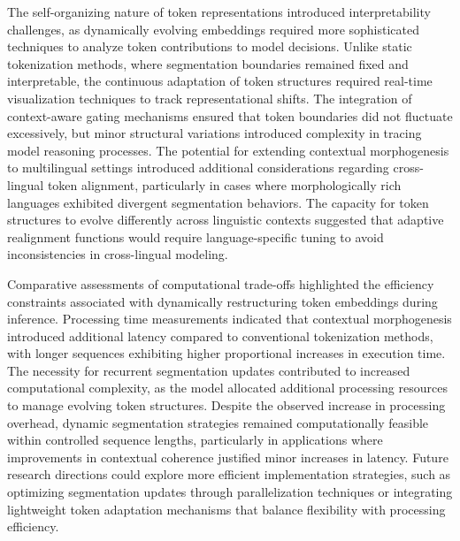 \documentclass{article}
\begin{document}
The self-organizing nature of token representations introduced interpretability challenges, as dynamically evolving embeddings required more sophisticated techniques to analyze token contributions to model decisions. Unlike static tokenization methods, where segmentation boundaries remained fixed and interpretable, the continuous adaptation of token structures required real-time visualization techniques to track representational shifts. The integration of context-aware gating mechanisms ensured that token boundaries did not fluctuate excessively, but minor structural variations introduced complexity in tracing model reasoning processes. The potential for extending contextual morphogenesis to multilingual settings introduced additional considerations regarding cross-lingual token alignment, particularly in cases where morphologically rich languages exhibited divergent segmentation behaviors. The capacity for token structures to evolve differently across linguistic contexts suggested that adaptive realignment functions would require language-specific tuning to avoid inconsistencies in cross-lingual modeling.

Comparative assessments of computational trade-offs highlighted the efficiency constraints associated with dynamically restructuring token embeddings during inference. Processing time measurements indicated that contextual morphogenesis introduced additional latency compared to conventional tokenization methods, with longer sequences exhibiting higher proportional increases in execution time. The necessity for recurrent segmentation updates contributed to increased computational complexity, as the model allocated additional processing resources to manage evolving token structures. Despite the observed increase in processing overhead, dynamic segmentation strategies remained computationally feasible within controlled sequence lengths, particularly in applications where improvements in contextual coherence justified minor increases in latency. Future research directions could explore more efficient implementation strategies, such as optimizing segmentation updates through parallelization techniques or integrating lightweight token adaptation mechanisms that balance flexibility with processing efficiency.
\end{document}
